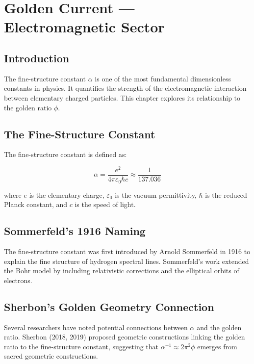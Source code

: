 \chapter{Golden Current — Electromagnetic Sector}
\label{ch:16}

\section{Introduction}

The fine-structure constant $\alpha$ is one of the most fundamental dimensionless constants in physics. It quantifies the strength of the electromagnetic interaction between elementary charged particles. This chapter explores its relationship to the golden ratio $\phi$.

\section{The Fine-Structure Constant}

The fine-structure constant is defined as:

\begin{equation}
\alpha = \frac{e^2}{4\pi\varepsilon_0\hbar c} \approx \frac{1}{137.036}
\end{equation}

where $e$ is the elementary charge, $\varepsilon_0$ is the vacuum permittivity, $\hbar$ is the reduced Planck constant, and $c$ is the speed of light.

\section{Sommerfeld's 1916 Naming}

The fine-structure constant was first introduced by Arnold Sommerfeld in 1916 to explain the fine structure of hydrogen spectral lines. Sommerfeld's work extended the Bohr model by including relativistic corrections and the elliptical orbits of electrons.

\section{Sherbon's Golden Geometry Connection}

Several researchers have noted potential connections between $\alpha$ and the golden ratio. Sherbon (2018, 2019) proposed geometric constructions linking the golden ratio to the fine-structure constant, suggesting that $\alpha^{-1} \approx 2\pi^2\phi$ emerges from sacred geometric constructions.

